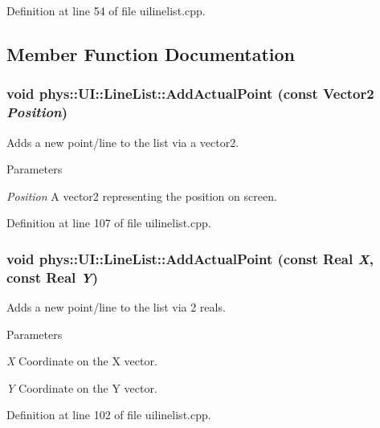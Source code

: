 Definition at line 54 of file uilinelist.cpp.



\subsection{Member Function Documentation}
\hypertarget{classphys_1_1UI_1_1LineList_ab867e29dafa4e512f2ab655388214a96}{
\subsubsection[{AddActualPoint}]{\setlength{\rightskip}{0pt plus 5cm}void phys::UI::LineList::AddActualPoint (const {\bf Vector2} {\em Position})}}
\label{d7/de8/classphys_1_1UI_1_1LineList_ab867e29dafa4e512f2ab655388214a96}


Adds a new point/line to the list via a vector2. 


\begin{DoxyParams}{Parameters}
\item[{\em Position}]A vector2 representing the position on screen. \end{DoxyParams}


Definition at line 107 of file uilinelist.cpp.

\hypertarget{classphys_1_1UI_1_1LineList_a6fdb46f6c8527d994bb6f37a764e5543}{
\subsubsection[{AddActualPoint}]{\setlength{\rightskip}{0pt plus 5cm}void phys::UI::LineList::AddActualPoint (const {\bf Real} {\em X}, \/  const {\bf Real} {\em Y})}}
\label{d7/de8/classphys_1_1UI_1_1LineList_a6fdb46f6c8527d994bb6f37a764e5543}


Adds a new point/line to the list via 2 reals. 


\begin{DoxyParams}{Parameters}
\item[{\em X}]Coordinate on the X vector. \item[{\em Y}]Coordinate on the Y vector. \end{DoxyParams}


Definition at line 102 of file uilinelist.cpp.

